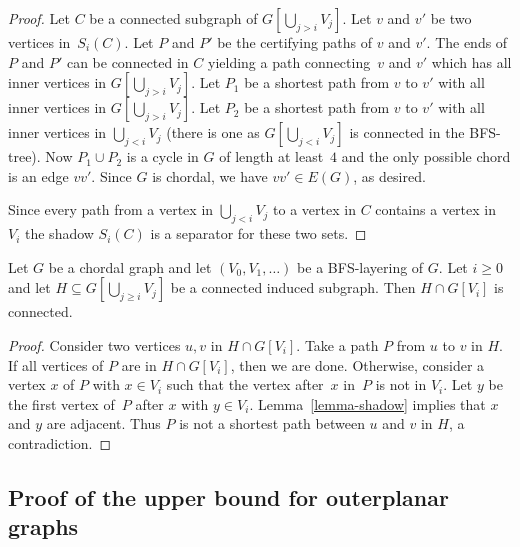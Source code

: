 \begin{proof}
  Let $C$ be a connected subgraph of $G[\bigcup_{j> i} V_j]$.  Let $v$
  and $v'$ be two vertices in~$S_i(C)$.  Let $P$ and $P'$ be the
  certifying paths of $v$ and $v'$. The ends of $P$ and $P'$ can be
  connected in $C$ yielding a path connecting~$v$ and $v'$ which has
  all inner vertices in $G[\bigcup_{j> i} V_j]$. Let $P_1$ be a
  shortest path from $v$ to $v'$ with all inner vertices in
  $G[\bigcup_{j> i} V_j]$. Let $P_2$ be a shortest path from $v$ to
  $v'$ with all inner vertices in $\bigcup_{j< i} V_j$ (there is one
  as $G\left[\bigcup_{j< i} V_j\right]$ is connected in the BFS-tree).
  Now $P_1 \cup P_2$ is a cycle in $G$ of length at least~$4$ and the
  only possible chord is an edge $vv'$.  Since $G$ is chordal, we have
  $vv'\in E(G)$, as desired.

  Since every path from a vertex in $\bigcup_{j< i} V_j$ to a vertex
  in $C$ contains a vertex in $V_i$ the shadow $S_i(C)$ is a separator
  for these two sets.
\end{proof}

\begin{corollary}
  Let $G$ be a chordal graph and let $(V_0,V_1,\ldots)$ be a BFS-layering of
  $G$. Let $i\geq0$ and let $H\subseteq G[\bigcup_{j\geq i} V_j]$ be a
  connected induced subgraph. Then $H\cap G[V_i]$ is connected.
	\label{Cor:shadow}
\end{corollary}
\begin{proof}
  Consider two vertices $u,v$ in $H\cap G[V_i]$.  Take a path $P$ from $u$ to
  $v$ in $H$.  If all vertices of $P$ are in $H\cap G[V_i]$, then we are done.
  Otherwise, consider a vertex $x$ of $P$ with $x\in V_i$ such that the vertex
  after~$x$ in~$P$ is not in $V_i$.  Let $y$ be the first vertex of~$P$ after
  $x$ with $y\in V_i$. Lemma~\ref{lemma-shadow} implies that $x$ and $y$ are
  adjacent. Thus $P$ is not a shortest path between $u$ and $v$ in $H$, a
  contradiction.
\end{proof}

\subsection{Proof of the upper bound for outerplanar graphs}\hfill
	
